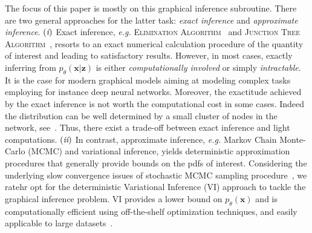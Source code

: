 \documentclass{article} %
\newcommand{\RN}[1]{%
	\textup{\lowercase\expandafter{\it \romannumeral#1}}%
}
\begin{document}
The focus of this paper is mostly on this graphical inference subroutine. 
There are two general approaches for the latter task: \textit{exact inference} and \textit{approximate inference}. $(\RN{1})$ Exact inference, \textit{e.g.} \textsc{Elimination Algorithm}~\citep{sanner2012symbolic} and \textsc{Junction Tree Algorithm}~\citep{kahle2008junction}, resorts to an exact numerical calculation procedure of the quantity of interest and leading to satisfactory results. 
However, in most cases, exactly inferring from $p_{\theta}(\mathbf{x}|\mathbf{z})$ is either \textit{computationally involved} or simply \textit{intractable}. It is the case for modern graphical models aiming at modeling complex tasks employing for instance deep neural networks.
Moreover, the exactitude achieved by the exact inference is not worth the computational cost in some cases.
Indeed the distribution can be well determined by a small cluster of nodes in the network, see~\citet{jordan1999introduction}. Thus, there exist a trade-off between exact inference and light computations. 
$(\RN{2})$ In contrast, approximate inference, \textit{e.g.} Markov Chain Monte-Carlo (MCMC) and variational inference, yields deterministic approximation procedures that generally provide bounds on the pdfs of interest. 
Considering the underlying slow convergence issues of stochastic MCMC sampling procedure~\citep{salimans2015markov}, we ratehr opt for the deterministic Variational Inference (VI) approach to tackle the graphical inference problem.
VI provides a lower bound on $p_{\theta}(\mathbf{x})$ and is computationally efficient using off-the-shelf optimization techniques, and easily applicable to large datasets~\citep{hoffman2013stochastic, kingma2013auto, liu2016stein}.
\end{document}
